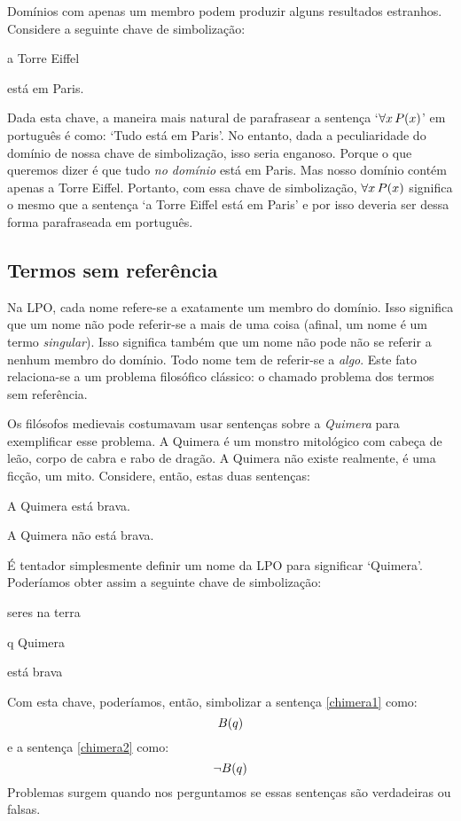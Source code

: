 Domínios com apenas um membro podem produzir alguns resultados estranhos.
Considere a seguinte chave de simbolização:
\begin{center}
\begin{ekey}
\item[\text{domínio}] a Torre Eiffel
\item[\atom{P}{x}]  está em Paris.
\end{ekey}
\end{center}
Dada esta chave, a maneira mais natural de parafrasear a sentença `$\forall x\,\mathord{P}(x)$' em português é como: `Tudo está em Paris'.
No entanto, dada a peculiaridade do domínio de nossa chave de simbolização, isso seria enganoso.
Porque o que queremos dizer é que tudo \emph{no domínio} está em Paris.
Mas nosso domínio contém apenas a Torre Eiffel.
Portanto, com essa chave de simbolização, $\forall x\,\mathord{P}(x)$ significa o mesmo que a sentença `a Torre Eiffel está em Paris' e por isso deveria ser dessa forma parafraseada em português.


\subsection{Termos sem referência}

Na LPO, cada nome refere-se a exatamente um membro do domínio.
Isso significa que um nome não pode referir-se a mais de uma coisa (afinal, um nome é um termo \emph{singular}).
Isso significa também que um nome não pode não se referir a nenhum membro do domínio.
Todo nome tem de referir-se a \emph{algo}.
Este fato relaciona-se a um problema filosófico clássico: o chamado problema dos termos sem referência.

Os filósofos medievais costumavam usar sentenças sobre a \emph{Quimera} para exemplificar esse problema.
A Quimera é um monstro mitológico com cabeça de leão, corpo de cabra e rabo de dragão.
A Quimera não existe realmente, é uma ficção, um mito.
Considere, então, estas duas sentenças:
\begin{earg}
\item[\ex{chimera1}] A Quimera está brava.
\item[\ex{chimera2}] A Quimera não está brava.
\end{earg}
É tentador simplesmente definir um nome da LPO para significar `Quimera'.
Poderíamos obter assim a seguinte chave de simbolização:
\begin{center}
\begin{ekey}
\item[\text{domínio}] seres na terra
\item[q] Quimera
\item[\atom{B}{x}]  está brava
\end{ekey}
\end{center}
Com esta chave, poderíamos, então, simbolizar a sentença \ref{chimera1} como:
$$\mathord{B}(q)$$
e a sentença \ref{chimera2} como:
$$\neg\mathord{B}(q)$$
Problemas surgem quando nos perguntamos se essas sentenças são verdadeiras ou falsas.


